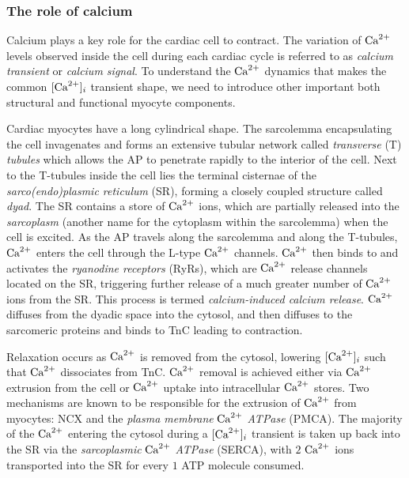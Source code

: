 %
%
%
\subsubsection{The role of calcium}
Calcium plays a key role for the cardiac cell to contract. The variation of $\textrm{Ca}^{2+}$ levels observed inside the cell during each cardiac cycle is referred to as \textit{calcium transient} or \textit{calcium signal}. To understand the $\textrm{Ca}^{2+}$ dynamics that makes the common $[\textrm{Ca}^{2+}]_{i}$ transient shape, we need to introduce other important both structural and functional myocyte components.

\vspace{0.2cm}
Cardiac myocytes have a long cylindrical shape. The sarcolemma encapsulating the cell invagenates and forms an extensive tubular network called \textit{transverse} (\acs{T}) \textit{tubules} which allows the AP to penetrate rapidly to the interior of the cell. Next to the T-tubules inside the cell lies the terminal cisternae of the \textit{sarco(endo)plasmic reticulum} (\acs{SR}), forming a closely coupled structure called \textit{dyad}. The SR contains a store of $\textrm{Ca}^{2+}$ ions, which are partially released into the \textit{sarcoplasm} (another name for the cytoplasm within the sarcolemma) when the cell is excited. As the AP travels along the sarcolemma and along the T-tubules, $\textrm{Ca}^{2+}$ enters the cell through the L-type $\textrm{Ca}^{2+}$ channels. $\textrm{Ca}^{2+}$ then binds to and activates the \textit{ryanodine receptors} (\acs{RyR}s), which are $\textrm{Ca}^{2+}$ release channels located on the SR, triggering further release of a much greater number of $\textrm{Ca}^{2+}$ ions from the SR. This process is termed \textit{calcium-induced calcium release}. $\textrm{Ca}^{2+}$ diffuses from the dyadic space into the cytosol, and then diffuses to the sarcomeric proteins and binds to TnC leading to contraction.

\vspace{0.2cm}
Relaxation occurs as $\textrm{Ca}^{2+}$ is removed from the cytosol, lowering $[\textrm{Ca}^{2+}]_{i}$ such that $\textrm{Ca}^{2+}$ dissociates from TnC. $\textrm{Ca}^{2+}$ removal is achieved either via $\textrm{Ca}^{2+}$ extrusion from the cell or $\textrm{Ca}^{2+}$ uptake into intracellular $\textrm{Ca}^{2+}$ stores. Two mechanisms are known to be responsible for the extrusion of $\textrm{Ca}^{2+}$ from myocytes: NCX and the \textit{plasma membrane} $\textrm{Ca}^{2+}$ \textit{ATPase} (\acs{PMCA}). The majority of the $\textrm{Ca}^{2+}$ entering the cytosol during a $[\textrm{Ca}^{2+}]_{i}$ transient is taken up back into the SR via the \textit{sarcoplasmic} $\textrm{Ca}^{2+}$ \textit{ATPase} (\acs{SERCA}), with $2$ $\textrm{Ca}^{2+}$ ions transported into the SR for every $1$ ATP molecule consumed.

